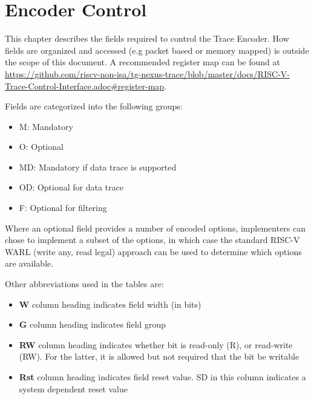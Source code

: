 \chapter{Encoder Control} \label{encoderControl}

This chapter describes the fields required to control the Trace Encoder.  
How fields are organized and accessed (e.g packet based or memory mapped) is outside the scope of this document.  
A recommended register map can be found at \href{https://github.com/riscv-non-isa/tg-nexus-trace/blob/master/docs/RISC-V-Trace-Control-Interface.adoc\#register-map}
{https://github.com/riscv-non-isa/tg-nexus-trace/blob/master/docs/RISC-V-Trace-Control-Interface.adoc\#register-map}.

{\color{red}{N.B. When the E-Trace v1.1.3 specification was released
    the draft versions of common controls v0 and v1 were incompatible with
    it. However, when the common control is completed the E-Trace
    specification will be amended to use the names given in the common control.}}

Fields are categorized into the following groups:

\begin{itemize}
  \item M: Mandatory
  \item O: Optional
  \item MD: Mandatory if data trace is supported
  \item OD: Optional for data trace
  \item F: Optional for filtering
\end{itemize}

Where an optional field provides a number of encoded options, implementers can chose to implement a subset of the options, 
in which case the standard RISC-V WARL (write any, read legal) approach can be used to determine which options are available.

Other abbreviations used in the tables are:
\begin{itemize}
  \item \textbf{W} column heading indicates field width (in bits)
  \item \textbf{G} column heading indicates field group
  \item \textbf{RW} column heading indicates whether bit is read-only (R), or read-write (RW).  
    For the latter, it is allowed but not required that the bit be writable
  \item \textbf{Rst} column heading indicates field reset value. SD in this column indicates a system dependent reset value
\end{itemize}

